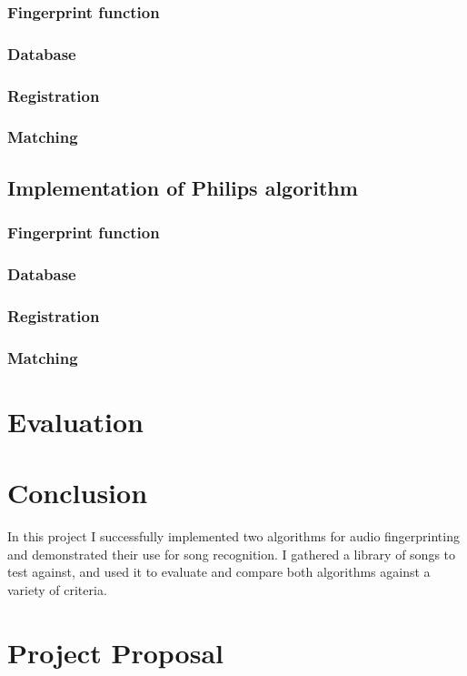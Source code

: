 \documentclass[12pt,a4paper,twoside,openright]{report}
\begin{document}
\subsection{Fingerprint function}
\subsection{Database}
\subsection{Registration}
\subsection{Matching}

\section{Implementation of Philips algorithm}
\label{section:philips}

\subsection{Fingerprint function}
\subsection{Database}
\subsection{Registration}
\subsection{Matching}





\chapter{Evaluation}



\chapter{Conclusion}

In this project I successfully implemented two algorithms for audio fingerprinting and demonstrated their use for song recognition. I gathered a library of songs to test against, and used it to evaluate and compare both algorithms against a variety of criteria.






\appendix


\chapter{Project Proposal}


\end{document}
